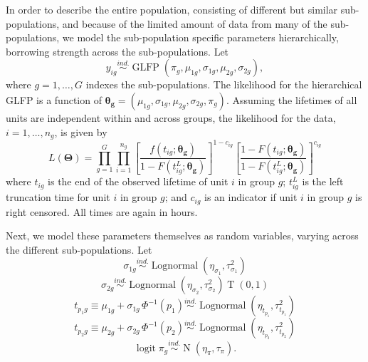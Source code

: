 \documentclass[12pt]{article}
\newcommand{\ind}{\stackrel{ind.}{\sim}}
\newcommand{\op}{\operatorname}
\begin{document}
In order to describe the entire population, consisting of different but similar sub-populations, and because of the limited amount of data from many of the sub-populations, we model the sub-population specific parameters hierarchically, borrowing strength across the sub-populations.  Let
\begin{equation}
y_{ig} \ind \op{GLFP}\left( \pi_g, \mu_{1g}, \sigma_{1g}, \mu_{2g}, \sigma_{2g} \right),
\end{equation}
where $g=1,\ldots,G$ indexes the sub-populations.  The likelihood for the hierarchical GLFP is a function of $\bm{\theta_g} = (\mu_{1g}, \sigma_{1g}, \mu_{2g}, \sigma_{2g}, \pi_{g})$.  Assuming the lifetimes of all units are independent within and across groups, the likelihood for the data, $i=1,\dots,n_g$,  is given by
\begin{equation*}
L(\bm{\Theta})= \prod_{g=1}^{G} \prod_{i=1}^{n_{g}} \left[\frac{f(t_{ig};\bm{\theta_g})}{1-F(t_{ig}^L;\bm{\theta_g})}\right]^{1-c_{ig}} \left[ \frac{1-F(t_{ig};\bm{\theta_g})}{1-F(t_{ig}^L;\bm{\theta_g})} \right]^{c_{ig}}
\end{equation*}
where $t_{ig}$ is the end of the observed lifetime of unit $i$ in group $g$; $t_{ig}^L$ is the left truncation time for unit $i$ in group $g$; and $c_{ig}$ is an indicator if unit $i$ in group $g$ is right censored.  All times are again in hours.

Next, we model these parameters themselves as random variables, varying across the different sub-populations.  Let
\begin{equation*}
\sigma_{1g} \ind \op{Lognormal} \left( \eta_{\sigma_1}, \tau^2_{\sigma_1} \right)
\end{equation*}
\begin{equation*}
\sigma_{2g} \ind \op{Lognormal} \left( \eta_{\sigma_2}, \tau^2_{\sigma_2}\right)\op{T}\left(0, 1\right)
\end{equation*}
\begin{equation}
\label{eq:hier-model}
t_{p_{1}g} \equiv \mu_{1g} + \sigma_{1g}\,\Phi^{-1}(p_1)  \ind \op{Lognormal} \left(\eta_{t_{p_1}}, \tau^2_{t_{p_1}}\right)
\end{equation}
\begin{equation*}
t_{p_{2}g} \equiv \mu_{2g} + \sigma_{2g}\,\Phi^{-1}(p_2)  \ind \op{Lognormal} \left(\eta_{t_{p_2}}, \tau^2_{t_{p_2}}\right)
\end{equation*}
\begin{equation*}
\op{logit} \pi_g \ind \op{N}(\eta_\pi, \tau_\pi).
\end{equation*}
\end{document}
